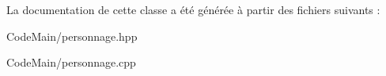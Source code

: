 La documentation de cette classe a été générée à partir des fichiers suivants \+:\begin{DoxyCompactItemize}
\item 
Code\+Main/personnage.\+hpp\item 
Code\+Main/personnage.\+cpp\end{DoxyCompactItemize}
